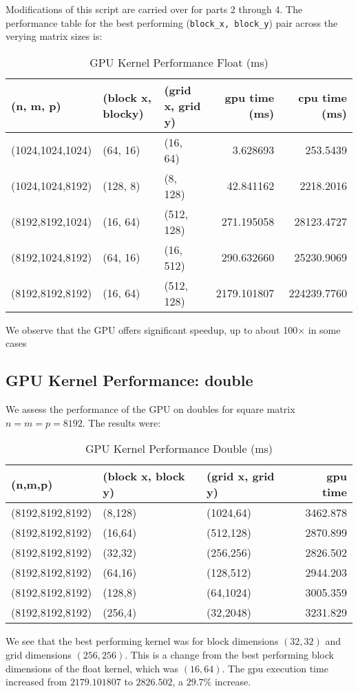 \documentclass{article}
\begin{document}
\noindent Modifications of this script are carried over for parts 2 through 4. 
The performance table for the best performing (\texttt{block\_x, block\_y}) pair 
across the verying matrix sizes is:
\begin{table}[H]
    \centering
    \caption{GPU Kernel Performance Float (ms)}
    \fontsize{12}{14}\selectfont
    \begin{tabular}[t]{lllrr}
    \toprule
    (n, m, p) & (block x, blocky) & (grid x, grid y) & gpu time (ms) & cpu time (ms)\\
    \midrule
    (1024,1024,1024) & (64, 16) & (16, 64) & 3.628693 & 253.5439\\
    (1024,1024,8192) & (128, 8) & (8, 128) & 42.841162 & 2218.2016\\
    (8192,8192,1024) & (16, 64) & (512, 128) & 271.195058 & 28123.4727\\
    (8192,1024,8192) & (64, 16) & (16, 512) & 290.632660 & 25230.9069\\
    (8192,8192,8192) & (16, 64) & (512, 128) & 2179.101807 & 224239.7760\\
    \bottomrule
    \end{tabular}
\end{table}
\noindent We observe that the GPU offers significant speedup, up to about 100$\times$ in some cases

\subsection{GPU Kernel Performance: double}
We assess the performance of the GPU on doubles for square matrix $n=m=p=8192$. 
The results were:
\begin{table}[H]
    \centering
    \caption{GPU Kernel Performance Double (ms)}
    \fontsize{12}{14}\selectfont
    \begin{tabular}[t]{lllr}
    \toprule
    (n,m,p) & (block x, block y) & (grid x, grid y) & gpu time\\
    \midrule
    (8192,8192,8192) & (8,128) & (1024,64) & 3462.878\\
    (8192,8192,8192) & (16,64) & (512,128) & 2870.899\\
    (8192,8192,8192) & (32,32) & (256,256) & 2826.502\\
    (8192,8192,8192) & (64,16) & (128,512) & 2944.203\\
    (8192,8192,8192) & (128,8) & (64,1024) & 3005.359\\
    (8192,8192,8192) & (256,4) & (32,2048) & 3231.829\\
    \bottomrule
    \end{tabular}
\end{table}
\noindent We see that the best performing kernel was for block dimensions $(32,32)$ and grid dimensions $(256,256)$.
This is a change from the best performing block dimensions of the float kernel, which was $(16,64)$. The 
gpu execution time increased from $2179.101807$ to $2826.502$, a $29.7\%$ increase.
\end{document}
